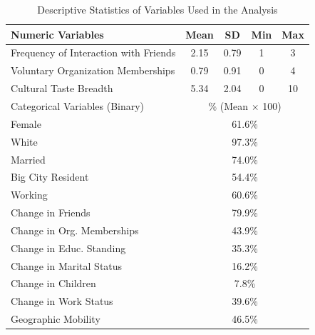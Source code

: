 \begin{table}[htbp]
\centering
\caption{Descriptive Statistics of Variables Used in the Analysis}
\begin{tabular}{l c c c c}
\toprule
Numeric Variables & Mean & SD & Min & Max \\
\midrule
Frequency of Interaction with Friends & 2.15 & 0.79 & 1 & 3 \\
Voluntary Organization Memberships & 0.79 & 0.91 & 0 & 4 \\
Cultural Taste Breadth & 5.34 & 2.04 & 0 & 10 \\
\midrule
Categorical Variables (Binary) & \multicolumn{4}{c}{\% (Mean $\times$ 100)} \\
\midrule
Female & \multicolumn{4}{c}{61.6\%} \\
White & \multicolumn{4}{c}{97.3\%} \\
Married & \multicolumn{4}{c}{74.0\%} \\
Big City Resident & \multicolumn{4}{c}{54.4\%} \\
Working & \multicolumn{4}{c}{60.6\%} \\
Change in Friends & \multicolumn{4}{c}{79.9\%} \\
Change in Org. Memberships & \multicolumn{4}{c}{43.9\%} \\
Change in Educ. Standing & \multicolumn{4}{c}{35.3\%} \\
Change in Marital Status & \multicolumn{4}{c}{16.2\%} \\
Change in Children & \multicolumn{4}{c}{7.8\%} \\
Change in Work Status & \multicolumn{4}{c}{39.6\%} \\
Geographic Mobility & \multicolumn{4}{c}{46.5\%} \\
\bottomrule
\end{tabular}
\end{table}
